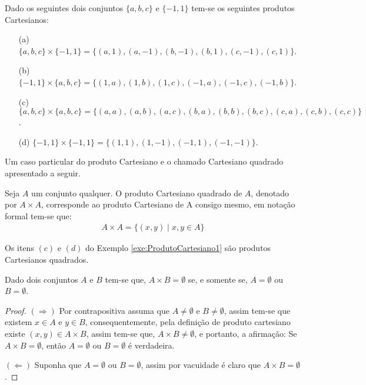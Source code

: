 \begin{example}\label{exe:ProdutoCartesiano1}
	Dado os seguintes dois conjuntos $\{a, b, c\}$ e $\{-1, 1\}$ tem-se os seguintes produtos Cartesianos:
	\begin{itemize}
		\item[(a)] $\{a, b, c\} \times \{-1, 1\}  = \{(a, 1), (a, -1), (b, -1), (b, 1), (c, -1), (c, 1)\}$.
		\item[(b)] $\{-1, 1\} \times \{a, b, c\}  = \{(1, a), (1, b), (1, c), (-1, a), (-1, c), (-1, b)\}$.
		\item[(c)] $\{a, b, c\} \times \{a, b, c\}   = \{(a, a), (a, b), (a, c), (b, a), (b, b), (b, c), (c, a), (c, b), (c, c)\}$.
		\item[(d)] $\{-1, 1\} \times \{-1, 1\} = \{(1, 1), (1, -1), (-1, 1), (-1, -1)\}$.
	\end{itemize}
\end{example}

Um caso particular do produto Cartesiano e o chamado Cartesiano quadrado apresentado a seguir.

\begin{definition}\label{def:CartesianoQuadrado}
	Seja $A$ um conjunto qualquer. O produto Cartesiano quadrado de $A$, denotado por $A \times A$, corresponde ao produto Cartesiano de A consigo mesmo, em notação formal tem-se que:
	\begin{eqnarray*}
		A \times A = \{(x, y) \mid x, y \in A\}
	\end{eqnarray*}
\end{definition}

\begin{example}\label{exe:ProdutoCartesiano2}
	Os itens $(c)$ e $(d)$ do Exemplo \ref{exe:ProdutoCartesiano1} são produtos Cartesianos quadrados.
\end{example}

\begin{theorem}\label{teo:AbsorcaoCatersiano}
	Dado dois conjuntos $A$ e $B$ tem-se que, $A \times B = \emptyset$ se, e somente se, $A = \emptyset$ ou $B = \emptyset$.
\end{theorem}

\begin{proof}
	$(\Rightarrow)$ Por contrapositiva assuma que $A \neq \emptyset$ e $B \neq \emptyset$, assim tem-se que existem $x \in A$ e $y \in B$, consequentemente, pela definição de produto cartesiano existe $(x,y) \in A \times B$, assim tem-se que, $A \times B \neq \emptyset$, e portanto, a afirmação: Se $A \times B = \emptyset$, então $A = \emptyset$ ou $B = \emptyset$ é verdadeira.
	
	$(\Leftarrow)$ Suponha que $A = \emptyset$ ou $B = \emptyset$, assim por vacuidade é claro que $A \times B = \emptyset$.
\end{proof}


